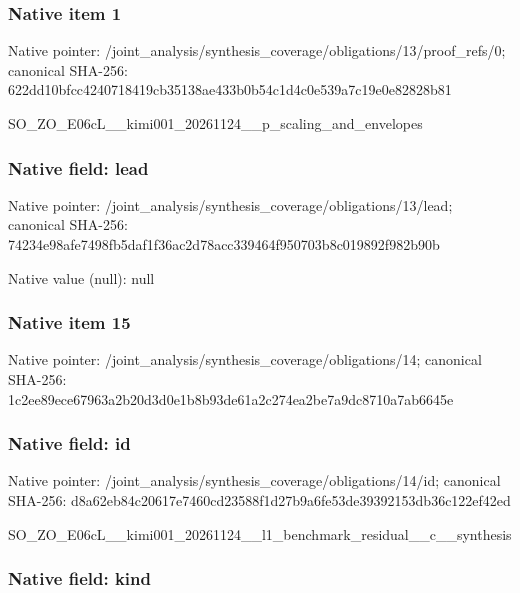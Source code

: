 \documentclass[10pt,a4paper]{article}
\begin{document}
\subsubsection{Native item 1}


Native pointer: /joint\_analysis/synthesi\allowbreak{}s\_coverage/obligations/1\allowbreak{}3/proof\_refs/0; canonical SHA-256: 622dd10bfcc4240718419cb3\allowbreak{}5138ae433b0b54c1d4c0e539\allowbreak{}a7c19e0e82828b81


SO\_ZO\_E06cL\_\_kimi001\_202\allowbreak{}61124\_\_p\_scaling\_and\_env\allowbreak{}elopes


\subsubsection{Native field: lead}


Native pointer: /joint\_analysis/synthesi\allowbreak{}s\_coverage/obligations/1\allowbreak{}3/lead; canonical SHA-256: 74234e98afe7498fb5daf1f3\allowbreak{}6ac2d78acc339464f950703b\allowbreak{}8c019892f982b90b



Native value (null): null



\subsubsection{Native item 15}


Native pointer: /joint\_analysis/synthesi\allowbreak{}s\_coverage/obligations/1\allowbreak{}4; canonical SHA-256: 1c2ee89ece67963a2b20d3d0\allowbreak{}e1b8b93de61a2c274ea2be7a\allowbreak{}9dc8710a7ab6645e



\subsubsection{Native field: id}


Native pointer: /joint\_analysis/synthesi\allowbreak{}s\_coverage/obligations/1\allowbreak{}4/id; canonical SHA-256: d8a62eb84c20617e7460cd23\allowbreak{}588f1d27b9a6fe53de393921\allowbreak{}53db36c122ef42ed


SO\_ZO\_E06cL\_\_kimi001\_202\allowbreak{}61124\_\_l1\_benchmark\_resi\allowbreak{}dual\_\_c\_\_synthesis


\subsubsection{Native field: kind}
\end{document}
